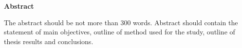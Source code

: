 \documentclass[../main.tex]{subfiles}
\begin{document}
 
\begin{center}
    {\fontsize{16}{1.5em} \selectfont \textbf{Abstract} }
\end{center}
\vspace{\baselineskip}
The abstract should be not more than 300 words. Abstract should contain the statement of main objectives, outline of method used for the study, outline of thesis results and conclusions.

\medskip
\end{document}
